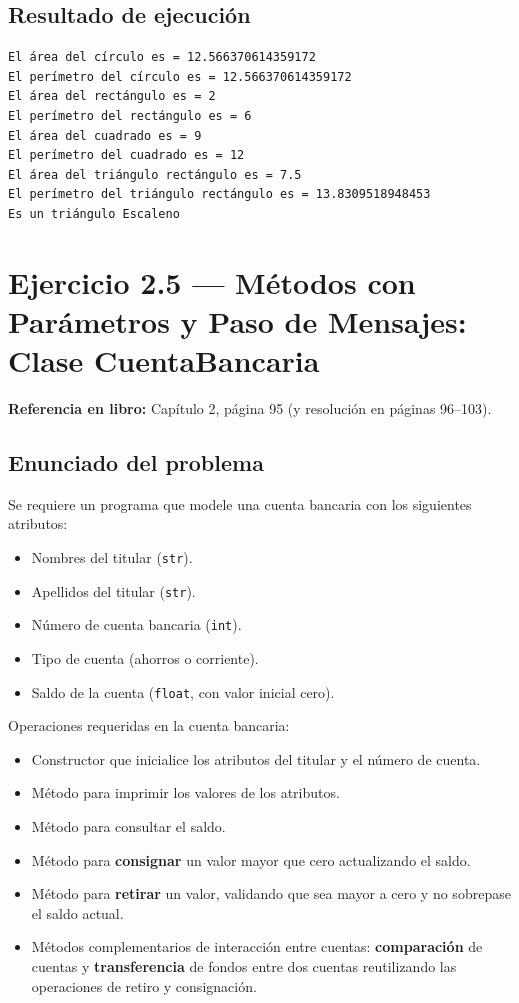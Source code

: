 \documentclass[11pt,a4paper]{article}
\begin{document}
\subsection{Resultado de ejecución}
\begin{verbatim}
El área del círculo es = 12.566370614359172
El perímetro del círculo es = 12.566370614359172
El área del rectángulo es = 2
El perímetro del rectángulo es = 6
El área del cuadrado es = 9
El perímetro del cuadrado es = 12
El área del triángulo rectángulo es = 7.5
El perímetro del triángulo rectángulo es = 13.8309518948453
Es un triángulo Escaleno
\end{verbatim}

\newpage

\section{Ejercicio 2.5 — Métodos con Parámetros y Paso de Mensajes: Clase CuentaBancaria}
\textbf{Referencia en libro:} Capítulo 2, página 95 (y resolución en páginas 96--103).

\subsection{Enunciado del problema}
Se requiere un programa que modele una cuenta bancaria con los siguientes atributos:
\begin{itemize}
    \item Nombres del titular (\texttt{str}).
    \item Apellidos del titular (\texttt{str}).
    \item Número de cuenta bancaria (\texttt{int}).
    \item Tipo de cuenta (ahorros o corriente).
    \item Saldo de la cuenta (\texttt{float}, con valor inicial cero).
\end{itemize}

Operaciones requeridas en la cuenta bancaria:
\begin{itemize}
    \item Constructor que inicialice los atributos del titular y el número de cuenta.
    \item Método para imprimir los valores de los atributos.
    \item Método para consultar el saldo.
    \item Método para \textbf{consignar} un valor mayor que cero actualizando el saldo.
    \item Método para \textbf{retirar} un valor, validando que sea mayor a cero y no sobrepase el saldo actual.
    \item Métodos complementarios de interacción entre cuentas: \textbf{comparación} de cuentas y \textbf{transferencia} de fondos entre dos cuentas reutilizando las operaciones de retiro y consignación.
\end{itemize}
\end{document}

